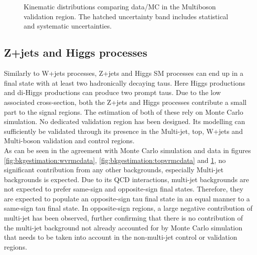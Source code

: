 \begin{figure}[!htpb]\centering
{}
\\
\\
  \caption{Kinematic distributions comparing data/MC in the Multiboson validation region. The hatched uncertainty band includes statistical and systematic uncertainties.  \label{fig:bkgestimation:mbdatamc} }
\end{figure}

\FloatBarrier
\subsection{Z+jets and Higgs processes}

Similarly to W+jets processes, Z+jets and Higgs \ac{SM} processes can end up in a final state with at least two hadronically decaying taus.  Here Higgs productions and di-Higgs productions can produce two prompt taus.  Due to the low associated cross-section,  both the Z+jets and Higgs processes contribute a small part to the signal regions. 
The estimation of both of these rely on Monte Carlo simulation.  No dedicated validation region has been designed.  Its modelling can sufficiently be validated through its presence in the Multi-jet, top, W+jets and Multi-boson validation and control regions. 
\\

As can be seen in the agreement with Monte Carlo simulation and data in figures \ref{fig:bkgestimation:wvrmcdata}, \ref{fig:bkgestimation:topvrmcdata} and  \ref{fig:bkgestimation:mbdatamc},  no significant contribution from any other backgrounds, especially Multi-jet backgrounds is expected.  Due to its QCD interactions,  multi-jet backgrounds are not expected to prefer same-sign and opposite-sign final states. Therefore, they are expected to populate an opposite-sign tau final state in an equal manner to a same-sign tau final state.  In opposite-sign regions,  a large negative contribution of multi-jet has been observed,  further confirming that there is no contribution of the multi-jet background not already accounted for by Monte Carlo simulation that needs to be taken into account in the non-multi-jet control or validation regions.
